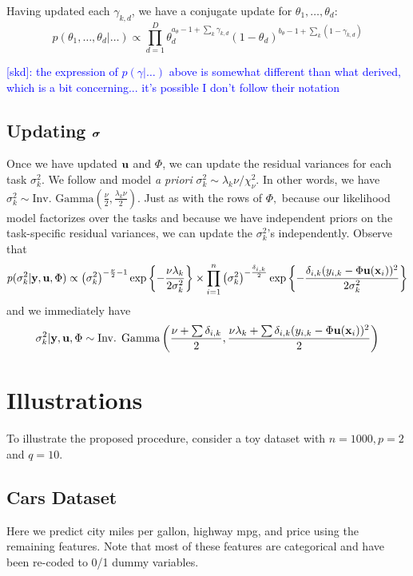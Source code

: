\documentclass[12pt]{article}
\begin{document}
Having updated each $\gamma_{k,d}$, we have a conjugate update for $\theta_{1},\ldots, \theta_{d}$:
$$
p(\theta_{1}, \ldots, \theta_{d} | \ldots) \propto \prod_{d = 1}^{D}{\theta_{d}^{a_{\theta} - 1 + \sum_{k}{\gamma_{k,d}}}(1 - \theta_{d})^{b_{\theta} - 1 + \sum_{k}{(1 - \gamma_{k,d})}}}
$$


\textcolor{blue}{[skd]: the expression of $p(\gamma | \ldots)$ above is somewhat different than what \citet{Titsias2011} derived, which is a bit concerning... it's possible I don't follow their notation}

\subsection{Updating $\boldsymbol{\sigma}$}
Once we have updated $\mathbf{u}$ and $\Phi$, we can update the residual variances for each task $\sigma^{2}_{k}.$
We follow \citet{Chipman2010} and model \textit{a priori} $\sigma_{k}^{2} \sim \lambda_{k}\nu/\chi^{2}_{\nu}.$
In other words, we have $\sigma^{2}_{k} \sim \text{Inv. Gamma}\left(\frac{\nu}{2}, \frac{\lambda_{k}\nu}{2}\right).$
Just as with the rows of $\Phi,$ because our likelihood model factorizes over the tasks and because we have independent priors on the task-specific residual variances, we can update the $\sigma^{2}_{k}$'s independently.
Observe that
$$
p(\sigma^{2}_{k} | \mathbf{y}, \mathbf{u}, \Phi) \propto \left(\sigma^{2}_{k}\right)^{-\frac{\nu}{2} - 1}\exp\left\{-\frac{\nu\lambda_{k}}{2\sigma^{2}_{k}}\right\} \times \prod_{i = 1}^{n}{\left(\sigma_{k}^{2}\right)^{-\frac{\delta_{i,k}}{2}}\exp\left\{-\frac{\delta_{i,k}(y_{i,k} - \Phi\mathbf{u}(\mathbf{x}_{i}))^{2}}{2\sigma^{2}_{k}}\right\}}
$$
and we immediately have
$$
\sigma^{2}_{k} | \mathbf{y}, \mathbf{u}, \Phi \sim \text{Inv. Gamma}\left(\frac{\nu + \sum{\delta_{i,k}}}{2}, \frac{\nu\lambda_{k} + \sum{\delta_{i,k}(y_{i,k} - \Phi\mathbf{u}(\mathbf{x}_{i}))^{2}}}{2}\right)
$$

\section{Illustrations}

To illustrate the proposed procedure, consider a toy dataset with $n = 1000, p = 2$ and $q = 10.$



\subsection{Cars Dataset}
Here we predict city miles per gallon, highway mpg, and price using the remaining features.
Note that most of these features are categorical and have been re-coded to 0/1 dummy variables.
\end{document}
